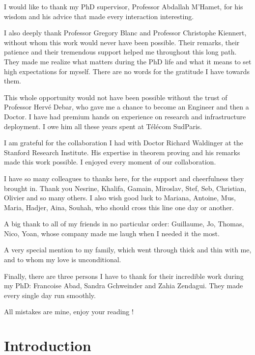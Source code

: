\documentclass[a4paper, 11pt]{report}
\theoremstyle{definition}
\begin{document}
I would like to thank my PhD supervisor, Professor Abdallah M'Hamet, for his wisdom and his advice that made every interaction interesting.

I also deeply thank Professor Gregory Blanc and Professor Christophe Kiennert, without whom this work 
would never have been possible. Their remarks, their patience and their tremendous support helped me throughout this long path. They made me realize what matters during the PhD life and what it means to set high expectations for myself. There are no words for the gratitude I have towards them.

This whole opportunity would not have been possible without the trust of Professor Herv\'e Debar, who gave me a chance to become an Engineer and then a Doctor. I have had premium hands on experience on research and infrastructure deployment. I owe him all these years spent at T\'el\'ecom SudParis.

I am grateful for the collaboration I had with Doctor Richard Waldinger at the Stanford Research Institute. His expertise in theorem proving and his remarks made this work possible. I enjoyed every moment of our collaboration.

I have so many colleagues to thanks here, for the support and cheerfulness they brought in.
Thank you Nesrine, Khalifa, Gamain, Miroslav, Stef, Seb, Christian, Olivier and so many others. I also wish good luck to Mariana, Antoine, Mus, Maria, Hadjer, Aina, Souhah, who should cross this line one day or another.

A big thank to all of my friends in no particular order: Guillaume, Jo, Thomas, Nico, Yoan, whose company made me laugh when I needed it the most. 

A very special mention to my family, which went through thick and thin with me, and to whom my love is unconditional. 

Finally, there are three persons I have to thank for their incredible work during my PhD: Francoise Abad, Sandra Gchweinder and Zahia Zendagui. They made every single day run smoothly.

All mistakes are mine, enjoy your reading !

\newpage

\tableofcontents
\listoffigures
 \listoftables
\thispagestyle{empty}


\newpage
{}
\chapter{Introduction}

 
\end{document}
